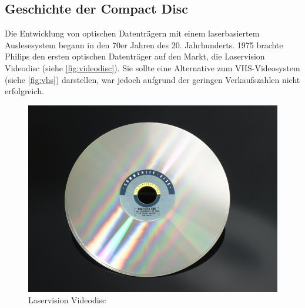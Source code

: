 \subsection{Geschichte der Compact Disc}
\label{subsec:cdgeschichte}

Die Entwicklung von optischen Datenträgern mit einem laserbasiertem
Auslesesystem begann in den 70er Jahren des 20. Jahrhunderts. 1975 brachte
Philips den ersten optischen Datenträger auf den Markt, die Laservision
Videodisc (siehe \autoref{fig:videodisc}). Sie sollte eine Alternative zum
VHS-Videosystem (siehe \autoref{fig:vhs}) darstellen, war jedoch aufgrund der
geringen Verkaufszahlen nicht erfolgreich.

\begin{figure}[h]
    \begin{center}
        \begin{minipage}[t]{0.3\textwidth}
            \begin{center}
                \includegraphics[height=0.1\textheight]{Bilder/Optische_Datentraeger_Die_Compact_Disc/Geschichte/videodisc.png}
                \caption[Laservision Videodisc \newline \url{http://www.sciencemuseum.org.uk/online_science/explore_our_collections/objects/index/smxg-8095649} (zuletzt aufgerufen am 19.09.2015)]{Laservision \newline Videodisc}
                \label{fig:videodisc}
            \end{center}
        \end{minipage}
        \hspace{0.025\textwidth}
        \begin{minipage}[t]{0.3\textwidth}

\end{minipage}
\end{center}
\end{figure}
